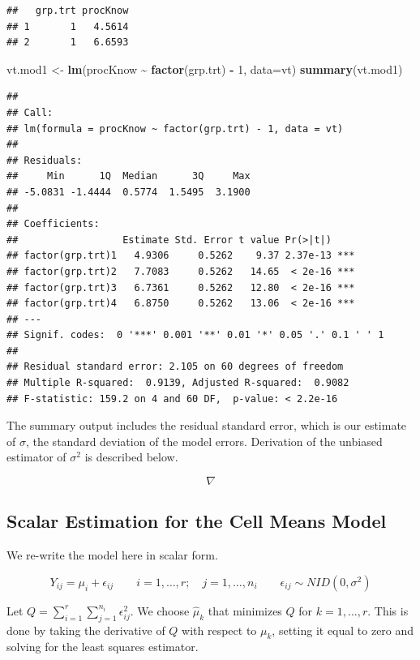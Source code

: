 \documentclass[
]{book}
\newenvironment{Shaded}{\begin{snugshade}}{\end{snugshade}}
\newcommand{\AttributeTok}[1]{\textcolor[rgb]{0.13,0.29,0.53}{#1}}
\newcommand{\DecValTok}[1]{\textcolor[rgb]{0.00,0.00,0.81}{#1}}
\newcommand{\FunctionTok}[1]{\textcolor[rgb]{0.13,0.29,0.53}{\textbf{#1}}}
\newcommand{\NormalTok}[1]{#1}
\newcommand{\OtherTok}[1]{\textcolor[rgb]{0.56,0.35,0.01}{#1}}
\newcommand{\SpecialCharTok}[1]{\textcolor[rgb]{0.81,0.36,0.00}{\textbf{#1}}}
\begin{document}
\begin{verbatim}
##   grp.trt procKnow
## 1       1   4.5614
## 2       1   6.6593
\end{verbatim}

\begin{Shaded}
\begin{Highlighting}[]
\NormalTok{vt.mod1 }\OtherTok{\textless{}{-}} \FunctionTok{lm}\NormalTok{(procKnow }\SpecialCharTok{\textasciitilde{}} \FunctionTok{factor}\NormalTok{(grp.trt) }\SpecialCharTok{{-}} \DecValTok{1}\NormalTok{, }\AttributeTok{data=}\NormalTok{vt)}
\FunctionTok{summary}\NormalTok{(vt.mod1)}
\end{Highlighting}
\end{Shaded}

\begin{verbatim}
## 
## Call:
## lm(formula = procKnow ~ factor(grp.trt) - 1, data = vt)
## 
## Residuals:
##     Min      1Q  Median      3Q     Max 
## -5.0831 -1.4444  0.5774  1.5495  3.1900 
## 
## Coefficients:
##                  Estimate Std. Error t value Pr(>|t|)    
## factor(grp.trt)1   4.9306     0.5262    9.37 2.37e-13 ***
## factor(grp.trt)2   7.7083     0.5262   14.65  < 2e-16 ***
## factor(grp.trt)3   6.7361     0.5262   12.80  < 2e-16 ***
## factor(grp.trt)4   6.8750     0.5262   13.06  < 2e-16 ***
## ---
## Signif. codes:  0 '***' 0.001 '**' 0.01 '*' 0.05 '.' 0.1 ' ' 1
## 
## Residual standard error: 2.105 on 60 degrees of freedom
## Multiple R-squared:  0.9139, Adjusted R-squared:  0.9082 
## F-statistic: 159.2 on 4 and 60 DF,  p-value: < 2.2e-16
\end{verbatim}

The summary output includes the residual standard error, which is our
estimate of \(\sigma\), the standard deviation of the model errors.
Derivation of the unbiased estimator of \(\sigma^2\) is described below.

\[\nabla\]

\subsection{Scalar Estimation for the Cell Means
Model}\label{scalar-estimation-for-the-cell-means-model}

We re-write the model here in scalar form.

\[ Y_{ij}=\mu_i + \epsilon_{ij} 
\qquad i=1,\ldots,r; \quad j=1,\ldots, n_i \qquad \epsilon_{ij} \sim NID\left(0,\sigma^2\right) \]

Let \(Q=\sum_{i=1}^r\sum_{j=1}^{n_i}\epsilon_{ij}^2\). We choose
\(\hat{\mu}_k\) that minimizes \(Q\) for \(k=1,\ldots ,r\). This is done
by taking the derivative of \(Q\) with respect to \(\mu_k\), setting it
equal to zero and solving for the least squares estimator.
\end{document}
